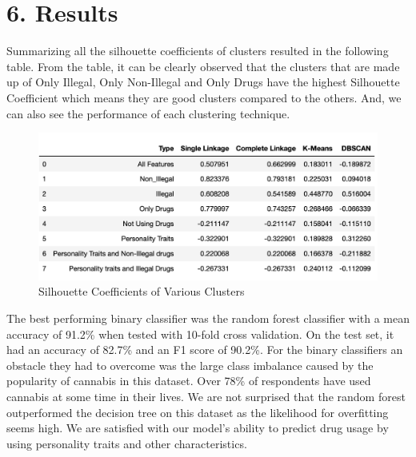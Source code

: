 \documentclass[10pt]{article}
\begin{document}
    
\section*{6. Results}

	Summarizing all the silhouette coefficients of clusters resulted in the following table. From the table, it can be clearly observed that the clusters that are made up of Only Illegal, Only Non-Illegal and Only Drugs have the highest Silhouette Coefficient which means they are good clusters compared to the others. And, we can also see the performance of each clustering technique.
 \begin{figure}[H]
\caption{Silhouette Coefficients of Various Clusters }
\label{fig:SilhouetteCoeff}
\centering
\includegraphics[scale=0.5]{Cluster_Table.png}
\end{figure}

The best performing binary classifier was the random forest classifier with a mean accuracy of 91.2\% when tested with 10-fold cross validation. On the test set, it had an accuracy of 82.7\% and an F1 score of 90.2\%. For the binary classifiers an obstacle they had to overcome was the large class imbalance caused by the popularity of cannabis in this dataset. Over 78\% of respondents have used cannabis at some time in their lives. We are not surprised that the random forest outperformed the decision tree on this dataset as the likelihood for overfitting seems high. We are satisfied with our model's ability to predict drug usage by using personality traits and other characteristics.
    
\end{document}
